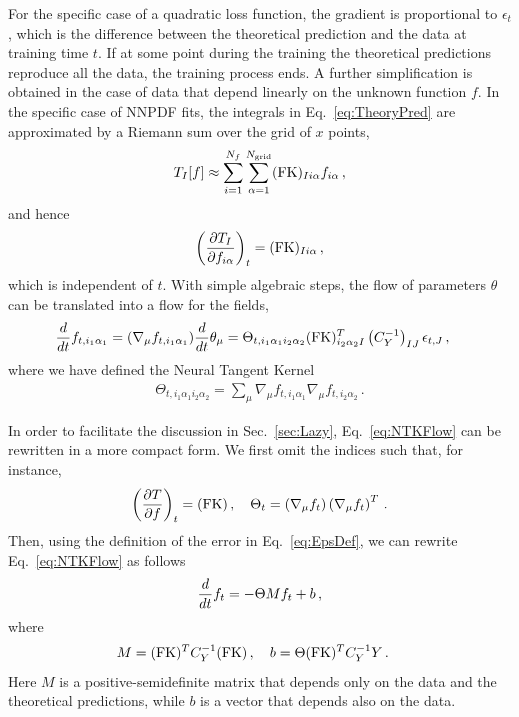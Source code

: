 For the specific case of a quadratic loss function, the gradient is proportional
to $\epsilon_t$, which is the difference between the theoretical prediction and
the data at training time $t$. If at some point during the training the
theoretical predictions reproduce all the data, the training process ends. A
further simplification is obtained in the case of data that depend linearly on
the unknown function $f$. In the specific case of NNPDF fits, the integrals in
Eq.~\eqref{eq:TheoryPred} are approximated by a Riemann sum over the grid of $x$
points,
\begin{align}
    \label{eq:FKTabDef}
    T_I[f] \approx \sum_{i=1}^{N_{f}}\sum_{\alpha=1}^{N_{\mathrm{grid}}} (\mathrm{FK})_{Ii\alpha} f_{i\alpha}\, ,
\end{align}
and hence
\begin{align}
    \label{eq:dTbydf}
    \left(\frac{\partial T_I}{\partial f_{i\alpha}}\right)_t =
        (\mathrm{FK})_{Ii\alpha}\, ,
\end{align}
which is independent of $t$. With simple algebraic steps, the flow of parameters
$\theta$ can be translated into a flow for the fields,
\begin{align}
    \label{eq:NTKFlow}
    \frac{d}{dt} &f_{t,i_1\alpha_1} = (\nabla_\mu f_{t,i_1\alpha_1}) \frac{d}{dt} \theta_\mu =
      \Theta_{t,i_1\alpha_1i_2\alpha_2}
      (\mathrm{FK})^T_{i_2\alpha_2I} \left(C_Y^{-1}\right)_{IJ} \epsilon_{t,J}\, ,
\end{align}
where we have defined the Neural Tangent Kernel~\cite{jacot2018neural}
\begin{align}
    \label{eq:NTKDef}
    \Theta_{t,i_1\alpha_1i_2\alpha_2} = \sum_\mu
    \nabla_\mu f_{t,i_1\alpha_1} \nabla_\mu f_{t,i_2\alpha_2}\, .
\end{align}

In order to facilitate the discussion in Sec.~\ref{sec:Lazy},
Eq.~\eqref{eq:NTKFlow} can be rewritten in a more compact form. We first omit
the indices such that, for instance,
\begin{align}
  \left(\frac{\partial T}{\partial f}\right)_t = (\mathrm{FK})\, , \quad
  \Theta_t = \left(\nabla_\mu f_t\right) \left(\nabla_\mu f_t\right)^T\, .
  \label{eq:dTdfForLinearObs}
\end{align}
Then, using the definition of the error in Eq.~\eqref{eq:EpsDef}, we can rewrite
Eq.~\eqref{eq:NTKFlow} as follows
\begin{align}
    \label{eq:FlowEquationNoIndices}
    \frac{d}{dt} f_t = -\Theta M f_t + b\, ,
\end{align}
where
\begin{align}
    M &= (\mathrm{FK})^T C_Y^{-1} (\mathrm{FK})\, , \quad b = \Theta (\mathrm{FK})^T C_Y^{-1} Y\, .
\end{align}
Here $M$ is a positive-semidefinite matrix that depends only on the data and the
theoretical predictions, while $b$ is a vector that depends also on the data.

